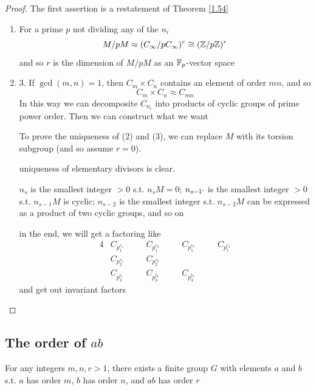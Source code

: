 \documentclass[11pt]{article}
\begin{document}
\begin{proof}
The first assertion is a restatement of Theorem \ref{1.54}
\begin{enumerate}
\item For a prime \(p\) not dividing any of the \(n_i\)
\begin{equation*}
M/pM\approx(C_\infty/pC_\infty)^r\cong(\mathbb{Z}/p\mathbb{Z})^r
\end{equation*}
and so \(r\) is the dimension of \(M/pM\) as an \(\mathbb{F}_p\)-vector space
\item 3. If \(\gcd(m,n)=1\), then \(C_m\times C_n\) contains an element of order \(mn\), and so
\begin{equation*}
C_m\times C_n\approx C_{mn}
\end{equation*}
In this way we can decomposite \(C_{n_i}\) into products of cyclic groups of prime power order.
Then we can construct what we want

To prove the uniqueness of (2) and (3), we can replace \(M\) with its torsion subgroup (and
so assume \(r=0\)).

uniqueness of elementary divisors is clear.

\(n_s\) is the smallest integer \(>0\) s.t. \(n_sM=0\); \(n_{s-1`}\) is the smallest
integer \(>0\) s.t. \(n_{s-1}M\) is cyclic; \(n_{s-2}\) is the smallest integer
s.t. \(n_{s-2}M\) can be expressed as a product of two cyclic groups, and so on

in the end, we will get a factoring like
\begin{alignat*}{4}
&C_{p_1^{r_1}}\quad&&C_{p_1^{r_2}}\quad&&C_{p_1^{r_3}}\quad&&C_{p_1^{r_4}}\\
&C_{p_2^{s_1}}&&C_{p_2^{s_2}}\\
&C_{p_3^{t_1}}&&C_{p_3^{t_2}}&&C_{p_3^{t_3}}
\end{alignat*}
and get out invariant factors
\end{enumerate}
\end{proof}
\subsection{The order of \texorpdfstring{\(ab\)}{ab}}
\label{sec:org78c527f}
\begin{theorem}[]
For any integers \(m,n,r>1\), there exists a finite group \(G\) with elements \(a\) and \(b\)
s.t. \(a\) has order \(m\), \(b\) has order \(n\), and \(ab\) has order \(r\)
\end{theorem}
\end{document}
